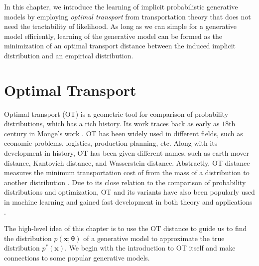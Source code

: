 In this chapter, we introduce the learning of implicit probabilistic generative models by employing \textit{optimal transport} from transportation theory that does not need the tractability of likelihood. As long as we can simple for a generative model efficiently, learning of the generative model can be formed as the minimization of an optimal transport distance between the induced implicit distribution and an empirical distribution.

\section{Optimal Transport}\label{chpt:sec:ot}
Optimal transport (OT) is a geometric tool for comparison of probability distributions, which has a rich history. Its work traces back as early as $18$th century in Monge's work \cite{monge1781memoire}. OT has been widely used in different fields, such as economic problems, logistics, production planning, etc. Along with its development in history, OT has been given different names, such as earth mover distance, Kantovich distance, and Wasserstein distance. Abstractly, OT distance measures the minimum transportation cost of from the mass of a distribution to another distribution \cite{villani2003topics}. Due to its close relation to the comparison of probability distributions and optimization, OT and its
variants have also been popularly used in machine learning and gained fast development in both theory and applications \cite{2013arXiv1310.4375C, 2013arXiv1306.0895C, 2016arXiv161006519S, ClaiciCS18}.

The high-level idea of this chapter is to use the OT distance to guide us to find the distribution $p(\bm{x}; \bm{\theta})$ of a generative model to approximate the true distribution $p^{\ast}(\bm{x})$. We begin with the introduction to OT itself and make connections to some popular generative models.

